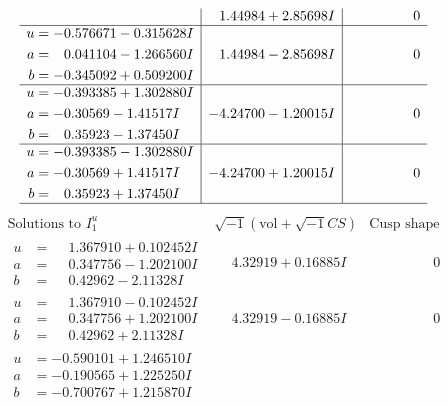 \documentclass[1p]{elsarticle_modified}
\theoremstyle{definition}
\newcommand{\I}{\sqrt{-1}}
\begin{document}
$$\begin{array}{c|c|c}
 & \phantom{-}1.44984 + 2.85698 I & \phantom{-0.000000 } 0 \\ \hline\begin{aligned}
u &= -0.576671 - 0.315628 I \\
a &= \phantom{-}0.041104 - 1.266560 I \\
b &= -0.345092 + 0.509200 I\end{aligned}
 & \phantom{-}1.44984 - 2.85698 I & \phantom{-0.000000 } 0 \\ \hline\begin{aligned}
u &= -0.393385 + 1.302880 I \\
a &= -0.30569 - 1.41517 I \\
b &= \phantom{-}0.35923 - 1.37450 I\end{aligned}
 & -4.24700 - 1.20015 I & \phantom{-0.000000 } 0 \\ \hline\begin{aligned}
u &= -0.393385 - 1.302880 I \\
a &= -0.30569 + 1.41517 I \\
b &= \phantom{-}0.35923 + 1.37450 I\end{aligned}
 & -4.24700 + 1.20015 I & \phantom{-0.000000 } 0\\
 \hline 
 \end{array}$$\newpage$$\begin{array}{c|c|c}  
\text{Solutions to }I^u_{1}& \I (\text{vol} + \sqrt{-1}CS) & \text{Cusp shape}\\
 \hline 
\begin{aligned}
u &= \phantom{-}1.367910 + 0.102452 I \\
a &= \phantom{-}0.347756 - 1.202100 I \\
b &= \phantom{-}0.42962 - 2.11328 I\end{aligned}
 & \phantom{-}4.32919 + 0.16885 I & \phantom{-0.000000 } 0 \\ \hline\begin{aligned}
u &= \phantom{-}1.367910 - 0.102452 I \\
a &= \phantom{-}0.347756 + 1.202100 I \\
b &= \phantom{-}0.42962 + 2.11328 I\end{aligned}
 & \phantom{-}4.32919 - 0.16885 I & \phantom{-0.000000 } 0 \\ \hline\begin{aligned}
u &= -0.590101 + 1.246510 I \\
a &= -0.190565 + 1.225250 I \\
b &= -0.700767 + 1.215870 I\end{aligned}

\end{array}$$
\end{document}
